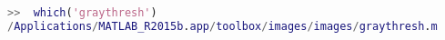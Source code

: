 \begin{lstlisting}[language=Matlab]
>>  which('graythresh')
/Applications/MATLAB_R2015b.app/toolbox/images/images/graythresh.m

\end{lstlisting}